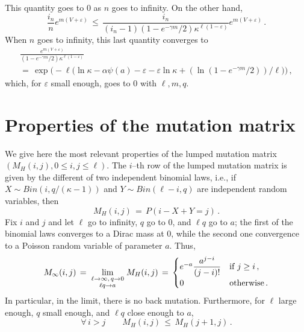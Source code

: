 \documentclass[a4paper,12pt]{article}
\theoremstyle{definition}
\theoremstyle{remark}
\def \a {\alpha}
\def \g {\gamma}
\def \e {\varepsilon}
\def \k {\kappa}
\def \exa {e^{-a}}
\begin{document}
This quantity goes to $0$ as $n$ goes to infinity.
On the other hand,
$$\frac{i_n}{n}
e^{m(V+\e)}\,\leq\,
\frac{i_n}{(i_n-1)(1-e^{-\g m}/2) \k^{\ell(1-\e)}}
e^{m(V+\e)}\,.$$
When $n$ goes to infinity,
this last quantity converges to
\begin{multline*}
\frac{e^{m(V+\e)}}{(1-e^{-\g m}/2)\k^{\ell(1-\e)}}\\=\,
\exp\Big(
-\ell\big(
\ln\k-\a\psi(a)-\e-\e\ln\k+(\ln (1-e^{-\g m}/2))/\ell
\big)
\Big)\,,
\end{multline*}
which, for $\e$ small enough, 
goes to $0$ with $\ell,m,q$.



\appendix
\section{Properties of the mutation matrix}
\label{Propmut}
We give here the most relevant properties of the lumped 
mutation matrix $(M_H(i,j),0\leq i,j\leq \ell)$.
The $i$--th row of the lumped mutation matrix
is given by the different of two independent binomial
laws, i.e.,
if $X\sim Bin(i,q/(\k-1))$ and $Y\sim Bin(\ell-i,q)$
are independent random variables, then
$$M_H(i,j)\,=\,P(i-X+Y=j)\,.$$
Fix $i$ and $j$
and let $\ell$ go to infinity, $q$ go to 0,
and $\ell q$ go to $a$;
the first of the binomial laws converges to a Dirac mass at $0$,
while the second one convergence to a Poisson random variable
of parameter $a$. Thus,
$$M_\infty(i,j)\,=\,\lim_{\genfrac{}{}{0pt}{1}{\ell\to\infty,\,q\to0}{\ell q\to a}}
M_H(i,j)\,=\,\begin{cases}
\exa\displaystyle\frac{a^{j-i}}{(j-i)!} &\text{if}\ j\geq i\,,\\
0 &\text{otherwise}\,.
\end{cases}$$
In particular, in the limit, there is no back mutation.
Furthermore, for $\ell$ large enough, $q$ small enough,
and $\ell q$ close enough to $a$,
$$\forall\,i>j\qquad
M_H(i,j)\,\leq\,M_H(j+1,j)\,.$$
\end{document}
